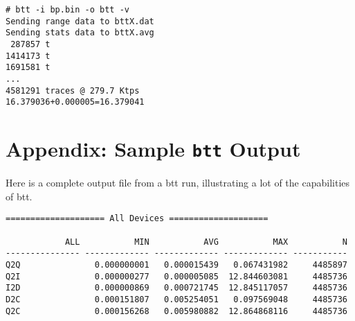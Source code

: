 \documentclass{article}
\begin{document}
\begin{verbatim}
# btt -i bp.bin -o btt -v
Sending range data to bttX.dat
Sending stats data to bttX.avg
 287857 t
1414173 t
1691581 t
...
4581291 traces @ 279.7 Ktps
16.379036+0.000005=16.379041
\end{verbatim}

\newpage\section{\label{sec:appendix}Appendix: Sample \texttt{btt}
Output}
  
  Here is a complete output file from a btt run, illustrating a lot of the
  capabilities of btt.

\begin{verbatim}
==================== All Devices ====================

            ALL           MIN           AVG           MAX           N
--------------- ------------- ------------- ------------- -----------
Q2Q               0.000000001   0.000015439   0.067431982     4485897
Q2I               0.000000277   0.000005085  12.844603081     4485736
I2D               0.000000869   0.000721745  12.845117057     4485736
D2C               0.000151807   0.005254051   0.097569048     4485736
Q2C               0.000156268   0.005980882  12.864868116     4485736

\end{verbatim}
\end{document}
